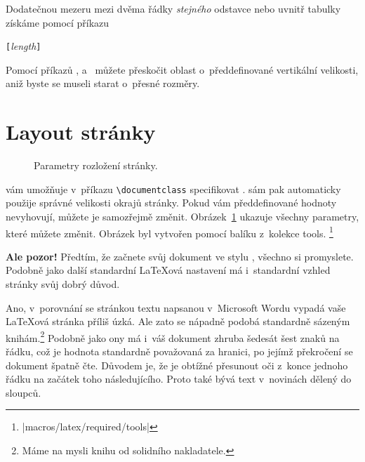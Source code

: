 Dodatečnou mezeru mezi dvěma řádky \emph{stejného} odstavce nebo
uvnitř tabulky získáme pomocí příkazu
\begin{lscommand}
\ci{\bs}\verb|[|\emph{length}\verb|]|
\end{lscommand}

Pomocí příkazů ,  a~ můžete přeskočit oblast
o~předdefinované vertikální velikosti, aniž byste se museli starat
o~přesné rozměry.


\section{Layout stránky}

\begin{figure}[!hp]
\begin{center}
\makeatletter\@mylayout\makeatother
\end{center}
\vspace*{1.8cm}
\caption{Parametry rozložení stránky.}
\label{fig:layout}
\end{figure}
\LaTeXe{} vám umožňuje v~příkazu \verb|\documentclass| specifikovat .
\LaTeXe{} sám pak automaticky použije správné velikosti okrajů stránky.
Pokud vám předdefinované hodnoty nevyhovují, můžete je samozřejmě změnit.
\thispagestyle{fancyplain}%
Obrázek~\ref{fig:layout} ukazuje všechny parametry, které můžete změnit.
Obrázek byl vytvořen pomocí balíku  z~kolekce tools.%
\footnote{\CTANref|macros/latex/required/tools|}

\textbf{Ale pozor!} Předtím, že začnete svůj dokument 
ve stylu , všechno si promyslete.
Podobně jako další standardní \LaTeX ová nastavení má i~standardní
vzhled stránky svůj dobrý důvod.

Ano, v~porovnání se stránkou textu napsanou v~Microsoft Wordu vypadá vaše
\LaTeX ová stránka příliš úzká. Ale zato se nápadně podobá standardně
sázeným knihám.\footnote{Máme na mysli knihu od solidního
nakladatele.} Podobně jako ony má i~váš dokument zhruba šedesát šest znaků
na řádku, což je hodnota standardně považovaná za hranici, po jejímž
překročení se dokument špatně čte. Důvodem je, že je obtížné přesunout
oči z~konce jednoho řádku na začátek toho následujícího. Proto také bývá text
v~novinách dělený do sloupců.


